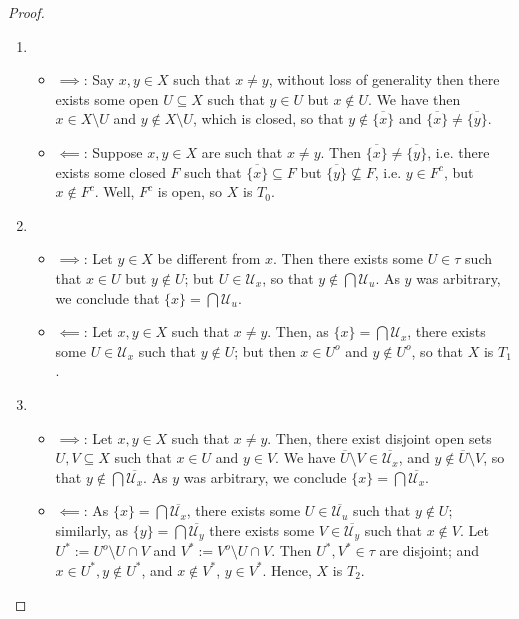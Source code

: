 \documentclass[12pt]{extarticle}
\newcommand{\set}[1]{\{#1\}}
\newcommand{\<}{\langle}
\renewcommand{\>}{\rangle}
\theoremstyle{definition}
\begin{document}
\begin{proof}
  \begin{enumerate}
  \item 
    \begin{itemize}
    \item
      $\implies$: Say $x,y \in X$ such that $x \neq y$, without loss of generality then there exists some open $U \subseteq X$ such that $y \in U$ but $x \not \in U$.
      We have then $x \in X \setminus U$ and $y \not \in X \setminus U$, which is closed, so that $y \not \in \overline{\set{x}}$ and $\overline{\set{x}} \neq \overline{\set{y}}$.
    \item 
      $\impliedby$: Suppose $x, y \in X$ are such that $x \neq y$. Then $\overline{\set{x}} \neq \overline{\set{y}}$, i.e. there exists some closed $F$ such that
      $\overline{\set{x}} \subseteq F$ but $\overline{\set{y}} \not \subseteq F$, i.e. $y \in F^c$, but $x \not \in F^c$. Well, $F^c$ is open, so $X$ is $T_0$.
    \end{itemize}
  \item
    \begin{itemize}
    \item
      $\implies$: Let $y \in X$ be different from $x$. Then there exists some $U \in \tau$ such that $x \in U$ but $y \not \in U$; but $U \in \mathcal{U}_x$, so that
      $y \not \in \bigcap\mathcal{U}_u$. As $y$ was arbitrary, we conclude that $\set{x} = \bigcap\mathcal{U}_u$.
    \item
      $\impliedby$: Let $x,y \in X$ such that $x \neq y$. Then, as $ \set{x} = \bigcap\limits \mathcal{U}_x$, there exists some $U \in \mathcal{U}_x$ such that $y \not \in U$;
      but then $x \in U^o$ and $y \not \in U^o$, so that $X$ is $T_1$.
    \end{itemize}
  \item
    \begin{itemize}
    \item $\implies$: Let $x,y \in X$ such that $x \neq y$. Then, there exist disjoint open sets $U, V \subseteq X$ such that $x \in U$ and $y \in V$.
      We have $\overline{U} \setminus V \in \overline{\mathcal{U}_x}$, and $y \not \in \overline{U} \setminus V$, so that $y \not \in \bigcap \overline{\mathcal{U}_x}$.
      As $y$ was arbitrary, we conclude $\set{x} = \bigcap \overline{\mathcal{U}_x}$.
    \item $\impliedby$: As $\set{x} = \bigcap \overline{\mathcal{U}_x}$, there exists some $U \in \overline{\mathcal{U}_u}$ such that $y \not \in U$;
      similarly, as $\set{y} = \bigcap \overline{\mathcal{U}_y}$ there exists some $V \in \overline{\mathcal{U}_y}$ such that $x \not \in V$.
      Let $U^{*} := U^o \setminus U \cap V$ and $V^{*} := V^o \setminus U \cap V$. Then $U^*, V^* \in \tau$ are disjoint; and $x \in U^*, y \not \in U^*$, and $x \not \in V^*$, $y \in V^*$.
      Hence, $X$ is $T_2$. 
    \end{itemize}
  \end{enumerate}
\end{proof}
\end{document}
